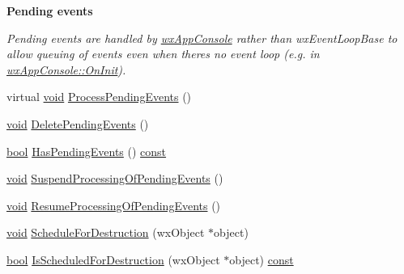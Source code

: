 \begin{Indent}{\bf Pending events}\par
{\em Pending events are handled by \hyperlink{classwx_app_console}{wx\+App\+Console} rather than wx\+Event\+Loop\+Base to allow queuing of events even when there\textquotesingle{}s no event loop (e.\+g. in \hyperlink{classwx_app_console_a99953775a2fd83fa2456e390779afe15}{wx\+App\+Console\+::\+On\+Init}). }\begin{DoxyCompactItemize}
\item 
virtual \hyperlink{sound_8c_ae35f5844602719cf66324f4de2a658b3}{void} \hyperlink{classwx_app_console_ab62db8e6265c1e841220c47b9778ab7e}{Process\+Pending\+Events} ()
\item 
\hyperlink{sound_8c_ae35f5844602719cf66324f4de2a658b3}{void} \hyperlink{classwx_app_console_ad89ebde765071beef409f6e6e81d1b31}{Delete\+Pending\+Events} ()
\item 
\hyperlink{mac_2config_2i386_2lib-src_2libsoxr_2soxr-config_8h_abb452686968e48b67397da5f97445f5b}{bool} \hyperlink{classwx_app_console_a253eccb58ac202af728ac4f137c88619}{Has\+Pending\+Events} () \hyperlink{getopt1_8c_a2c212835823e3c54a8ab6d95c652660e}{const} 
\item 
\hyperlink{sound_8c_ae35f5844602719cf66324f4de2a658b3}{void} \hyperlink{classwx_app_console_af892210f0e50a1c7df9ae39280cbc972}{Suspend\+Processing\+Of\+Pending\+Events} ()
\item 
\hyperlink{sound_8c_ae35f5844602719cf66324f4de2a658b3}{void} \hyperlink{classwx_app_console_a3ddc42127ce53b8cac04716315124765}{Resume\+Processing\+Of\+Pending\+Events} ()
\end{DoxyCompactItemize}
\end{Indent}
{\bf }\par
\begin{DoxyCompactItemize}
\item 
\hyperlink{sound_8c_ae35f5844602719cf66324f4de2a658b3}{void} \hyperlink{classwx_app_console_adc46f57d8691bc0098830522f9de9d90}{Schedule\+For\+Destruction} (wx\+Object $\ast$object)
\item 
\hyperlink{mac_2config_2i386_2lib-src_2libsoxr_2soxr-config_8h_abb452686968e48b67397da5f97445f5b}{bool} \hyperlink{classwx_app_console_aad8d60da021487976b4a620364100fa5}{Is\+Scheduled\+For\+Destruction} (wx\+Object $\ast$object) \hyperlink{getopt1_8c_a2c212835823e3c54a8ab6d95c652660e}{const} 
\end{DoxyCompactItemize}


